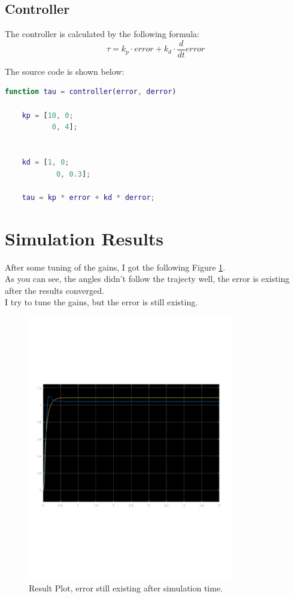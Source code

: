 \documentclass{article}
\begin{document}
\subsection*{Controller}

The controller is calculated by the following formula:
\begin{equation}
    \tau = k_p \cdot error + k_d \cdot \frac{d}{dt}error
\end{equation}


The source code is shown below:
\begin{lstlisting}[language=Matlab,  basicstyle=\small\ttfamily]
    function tau = controller(error, derror)

    kp = [10, 0;
           0, 4];
    
    
    kd = [1, 0;
            0, 0.3];
    
    tau = kp * error + kd * derror;
\end{lstlisting}

\section{Simulation Results}

After some tuning of the gains, I got the following Figure \ref{fig:result_plot}. \\
As you can see, the angles didn't follow the trajecty well, the error is existing after the results converged.\\
I try to tune the gains, but the error is still existing.\\ 
\begin{figure}[ht]
    \centering
    \includegraphics[width=0.8\textwidth]{figures/result.pdf}
    \caption{Result Plot, error still existing after simulation time.}
    \label{fig:result_plot}
\end{figure}
\end{document}
